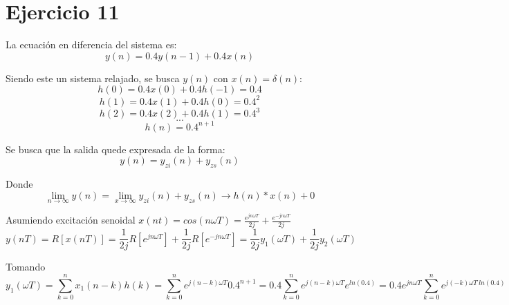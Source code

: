 \section*{Ejercicio 11}
La ecuación en diferencia del sistema es: %
\begin{equation*}
	y(n) = 0.4 y(n - 1) + 0.4 x(n)
\end{equation*}

Siendo este un sistema relajado, se busca $y(n)$ con $x(n) = \delta (n)$:
\begin{equation*}
	h(0) = 0.4 x(0) + 0.4h(-1) = 0.4
\end{equation*}
\begin{equation*}
	h(1) = 0.4 x(1) + 0.4h(0) = 0.4^2
\end{equation*}
\begin{equation*}
	h(2) = 0.4 x(2) + 0.4h(1) = 0.4^3
\end{equation*}
\begin{equation*}
	...
\end{equation*}
\begin{equation*}
	h(n) = 0.4^{n+1}
\end{equation*}

Se busca que la salida quede expresada de la forma:
\begin{equation*}
	y(n) = y_{zi}(n) + y_{zs}(n)
\end{equation*}

Donde
\begin{equation*}
	\lim_{n\to\infty} y(n) = \lim_{x\to\infty} y_{zi}(n) + y_{zs}(n) \longrightarrow h(n)*x(n) + 0
\end{equation*}

Asumiendo excitación senoidal $x(nt) = cos(n \omega T) = \frac{e^{j n \omega T}}{2j} + \frac{e^{-j n \omega T}}{2j}$
\begin{equation*}
	y(nT) = R[x(nT)] = \frac{1}{2j} R\left[ e^{j n \omega T} \right] + \frac{1}{2j} R\left[ e^{-j n \omega T} \right] = \frac{1}{2j} y_1 (\omega T) + \frac{1}{2j} y_2 (\omega T)
\end{equation*}

Tomando
\begin{equation*}
	y_1 (\omega T) = \sum_{k=0}^{n} x_1(n - k) h(k) = \sum_{k=0}^{n}e^{j \left( n - k \right) \omega T } 0.4^{n+1} = 0.4 \sum_{k=0}^{n}e^{j \left( n - k \right) \omega T } e^{ln \left( 0.4 \right) } = 0.4 e^{j n \omega T } \sum_{k=0}^{n}e^{j \left( - k \right) \omega T \ ln \left( 0.4 \right) }
\end{equation*}

